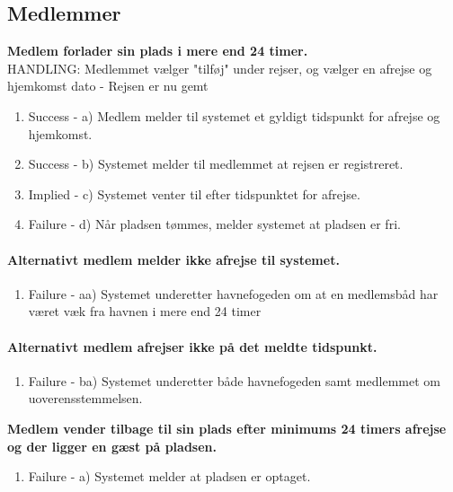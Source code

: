 
\subsection{Medlemmer}
	\item{\bf{Medlem forlader sin plads i mere end 24 timer.}}\\
		HANDLING: Medlemmet vælger "tilføj" under rejser, og vælger en afrejse og hjemkomst dato - Rejsen er nu gemt
	  \begin{enumerate}
			\item Success -  a) Medlem melder til systemet et gyldigt tidspunkt for afrejse og hjemkomst.
			\item Success -  b) Systemet melder til medlemmet at rejsen er registreret. 
			\item Implied -  c) Systemet venter til efter tidspunktet for afrejse.
			\item Failure -  d) Når pladsen tømmes, melder systemet at pladsen er fri.
	   \end{enumerate}
			
	\paragraph{Alternativt medlem melder ikke afrejse til systemet.}
	  \begin{enumerate}
			\item Failure -  aa) Systemet underetter havnefogeden om at en medlemsbåd har været væk fra havnen i mere end 24 timer
	   \end{enumerate}
	   
	\paragraph{Alternativt medlem afrejser ikke på det meldte tidspunkt.}
	  \begin{enumerate}
			\item Failure -  ba) Systemet underetter både havnefogeden samt medlemmet om uoverensstemmelsen.
	   \end{enumerate}
	   
	\item{\bf{Medlem vender tilbage til sin plads efter minimums 24 timers afrejse og der ligger en gæst på pladsen.}}
	  \begin{enumerate}
			\item Failure -  a) Systemet melder at pladsen er optaget.
	   \end{enumerate}
	   
